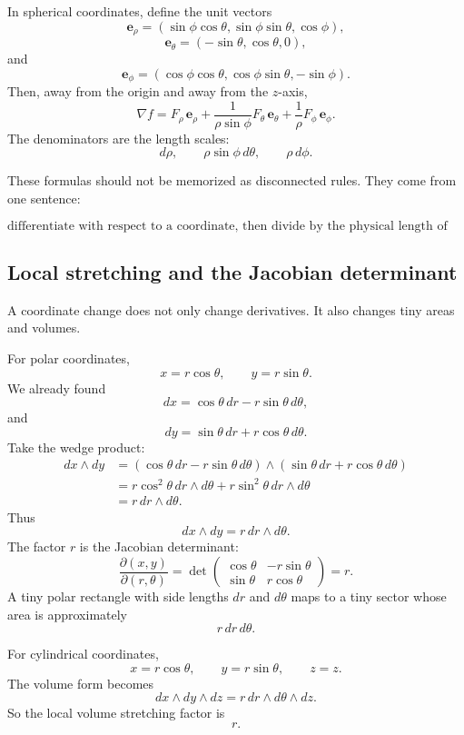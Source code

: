 In spherical coordinates, define the unit vectors
\[
    \mathbf e_\rho
    =
    (\sin\phi\cos\theta,\sin\phi\sin\theta,\cos\phi),
\]
\[
    \mathbf e_\theta
    =
    (-\sin\theta,\cos\theta,0),
\]
and
\[
    \mathbf e_\phi
    =
    (\cos\phi\cos\theta,\cos\phi\sin\theta,-\sin\phi).
\]
Then, away from the origin and away from the \(z\)-axis,
\[
\boxed{
    \nabla f
    =
    F_\rho\,\mathbf e_\rho
    +
    \frac{1}{\rho\sin\phi}F_\theta\,\mathbf e_\theta
    +
    \frac1\rho F_\phi\,\mathbf e_\phi.
}
\]
The denominators are the length scales:
\[
    d\rho,\qquad
    \rho\sin\phi\,d\theta,\qquad
    \rho\,d\phi.
\]

These formulas should not be memorized as disconnected rules.  They come from one
sentence:

\[
    \text{differentiate with respect to a coordinate, then divide by the physical length of
    that coordinate step.}
\]

\subsection{Local stretching and the Jacobian determinant}

A coordinate change does not only change derivatives.  It also changes tiny areas and
volumes.

For polar coordinates,
\[
    x=r\cos\theta,
    \qquad
    y=r\sin\theta.
\]
We already found
\[
    dx=\cos\theta\,dr-r\sin\theta\,d\theta,
\]
and
\[
    dy=\sin\theta\,dr+r\cos\theta\,d\theta.
\]
Take the wedge product:
\[
\begin{aligned}
dx\wedge dy
&=
(\cos\theta\,dr-r\sin\theta\,d\theta)
\wedge
(\sin\theta\,dr+r\cos\theta\,d\theta)\\
&=
r\cos^2\theta\,dr\wedge d\theta
+
r\sin^2\theta\,dr\wedge d\theta\\
&=
r\,dr\wedge d\theta.
\end{aligned}
\]
Thus
\[
\boxed{
    dx\wedge dy=r\,dr\wedge d\theta.
}
\]
The factor \(r\) is the Jacobian determinant:
\[
\boxed{
    \frac{\partial(x,y)}{\partial(r,\theta)}
    =
    \det
    \begin{pmatrix}
        \cos\theta & -r\sin\theta\\
        \sin\theta & r\cos\theta
    \end{pmatrix}
    =
    r.
}
\]
A tiny polar rectangle with side lengths \(dr\) and \(d\theta\) maps to a tiny sector
whose area is approximately
\[
    r\,dr\,d\theta.
\]

For cylindrical coordinates,
\[
    x=r\cos\theta,
    \qquad
    y=r\sin\theta,
    \qquad
    z=z.
\]
The volume form becomes
\[
\boxed{
    dx\wedge dy\wedge dz
    =
    r\,dr\wedge d\theta\wedge dz.
}
\]
So the local volume stretching factor is
\[
\boxed{
    r.
}
\]

